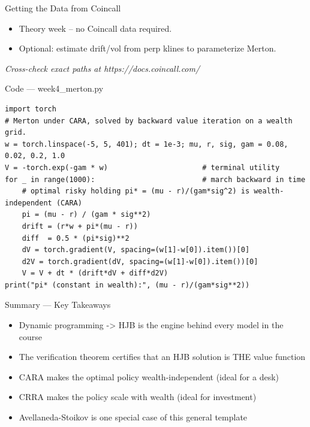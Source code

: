\documentclass[aspectratio=169,10pt]{beamer}
\begin{document}
\begin{frame}{Getting the Data from Coincall}
\begin{itemize}
  \item Theory week -- no Coincall data required.
  \item Optional: estimate drift/vol from perp klines to parameterize Merton.
\end{itemize}
\vspace{2pt}\tiny\textit{Cross-check exact paths at https://docs.coincall.com/}
\end{frame}

\begin{frame}[fragile]{Code --- week4\_merton.py}
\begin{lstlisting}
import torch
# Merton under CARA, solved by backward value iteration on a wealth grid.
w = torch.linspace(-5, 5, 401); dt = 1e-3; mu, r, sig, gam = 0.08, 0.02, 0.2, 1.0
V = -torch.exp(-gam * w)                      # terminal utility
for _ in range(1000):                         # march backward in time
    # optimal risky holding pi* = (mu - r)/(gam*sig^2) is wealth-independent (CARA)
    pi = (mu - r) / (gam * sig**2)
    drift = (r*w + pi*(mu - r))
    diff  = 0.5 * (pi*sig)**2
    dV = torch.gradient(V, spacing=(w[1]-w[0]).item())[0]
    d2V = torch.gradient(dV, spacing=(w[1]-w[0]).item())[0]
    V = V + dt * (drift*dV + diff*d2V)
print("pi* (constant in wealth):", (mu - r)/(gam*sig**2))
\end{lstlisting}
\end{frame}
\begin{frame}{Summary --- Key Takeaways}
\begin{itemize}
  \item Dynamic programming -\textgreater{} HJB is the engine behind every model in the course
  \item The verification theorem certifies that an HJB solution is THE value function
  \item CARA makes the optimal policy wealth-independent (ideal for a desk)
  \item CRRA makes the policy scale with wealth (ideal for investment)
  \item Avellaneda-Stoikov is one special case of this general template
\end{itemize}
\end{frame}
\end{document}
